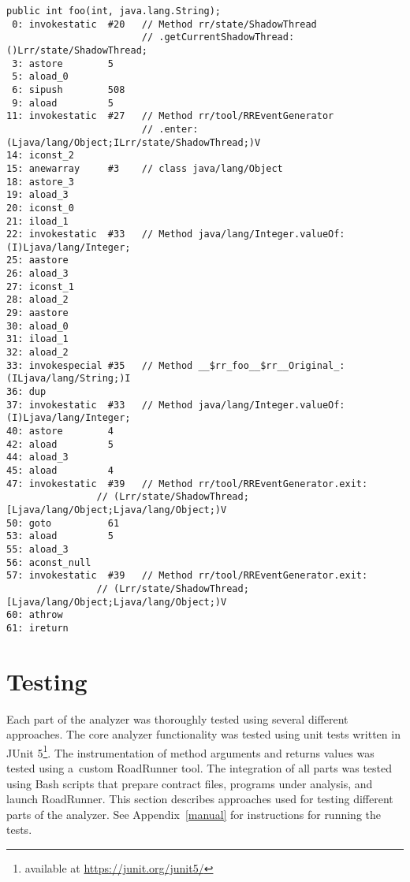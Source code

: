 \begin{lstlisting}[label=paramInst, float, caption={A method instrumented to
obtain arguments and the return value. On lines 5--11, the enter event is
generated. On lines 14--18, an array for arguments is created and stored in
a~local variable. On lines 19--25, the first argument is wrapped in an object
and stored in the array on index 0.  On lines 26--29, the second argument is
stored directly in the array on index 1. On lines 30--33, the original method is
called. On lines 36--40, the return value is wrapped and stored in a~local
variable. Lines 42--50 generate the exit event. Lines 53--60 contain a~catch
block in case an exception is thrown in the original function.}]
public int foo(int, java.lang.String);
 0: invokestatic  #20   // Method rr/state/ShadowThread
                        // .getCurrentShadowThread:()Lrr/state/ShadowThread;
 3: astore        5
 5: aload_0
 6: sipush        508
 9: aload         5
11: invokestatic  #27   // Method rr/tool/RREventGenerator
                        // .enter:(Ljava/lang/Object;ILrr/state/ShadowThread;)V
14: iconst_2
15: anewarray     #3    // class java/lang/Object
18: astore_3
19: aload_3
20: iconst_0
21: iload_1
22: invokestatic  #33   // Method java/lang/Integer.valueOf:(I)Ljava/lang/Integer;
25: aastore
26: aload_3
27: iconst_1
28: aload_2
29: aastore
30: aload_0
31: iload_1
32: aload_2
33: invokespecial #35   // Method __$rr_foo__$rr__Original_:(ILjava/lang/String;)I
36: dup
37: invokestatic  #33   // Method java/lang/Integer.valueOf:(I)Ljava/lang/Integer;
40: astore        4
42: aload         5
44: aload_3
45: aload         4
47: invokestatic  #39   // Method rr/tool/RREventGenerator.exit:
                // (Lrr/state/ShadowThread;[Ljava/lang/Object;Ljava/lang/Object;)V
50: goto          61
53: aload         5
55: aload_3
56: aconst_null
57: invokestatic  #39   // Method rr/tool/RREventGenerator.exit:
                // (Lrr/state/ShadowThread;[Ljava/lang/Object;Ljava/lang/Object;)V
60: athrow
61: ireturn\end{lstlisting}

\section{Testing}
\label{testing}

Each part of the analyzer was thoroughly tested using several different
approaches. The core analyzer functionality was tested using unit tests written
in JUnit 5\footnote{available at \url{https://junit.org/junit5/}}. The
instrumentation of method arguments and returns values was tested using a~custom
RoadRunner tool. The integration of all parts was tested using Bash scripts that
prepare contract files, programs under analysis, and launch RoadRunner. This
section describes approaches used for testing different parts of the analyzer.
See Appendix~\ref{manual} for instructions for running the tests.

